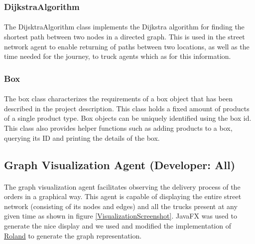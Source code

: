 \documentclass[11pt, a4paper]{article}
\begin{document}
\subsubsection{DijkstraAlgorithm}
\paragraph{}
The DijsktraAlgorithm class implements the Dijkstra algorithm for finding the shortest path between two nodes in a directed graph. This is used in the street network agent to enable returning of paths between two locations, as well as the time needed for the journey, to truck agents which as for this information.


\subsubsection{Box}
\paragraph{}
The box class characterizes the requirements of a box object that has been described in the project description. This class holds a fixed amount of products of a single product type. Box objects can be uniquely identified using the box id. This class also provides helper functions such as adding products to a box, querying its ID and printing the details of the box.

\newpage
\subsection{Graph Visualization Agent (Developer: All)}\label{GraphVisualizationAgent}
\paragraph{}
The graph visualization agent facilitates observing the delivery process of the orders in a graphical way. This agent is capable of displaying the entire street network (consisting of its nodes and edges) and all the trucks present at any given time as shown in figure \ref{VisualizationScreenshot}. JavaFX was used to generate the nice display and we used and modified the implementation of \href{https://stackoverflow.com/a/30696075}{Roland} to generate the graph representation.
\end{document}
